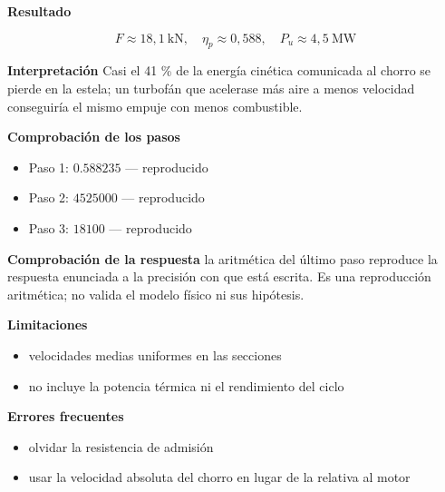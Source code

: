 \documentclass[10pt,openany]{book}
\begin{document}
\begin{tcolorbox}[title={Problema resuelto}, studiumworked, breakable]
\noindent\textbf{Resultado}

\[
F \approx 18{,}1\ \mathrm{kN},\quad \eta_p \approx 0{,}588,\quad P_u \approx 4{,}5\ \mathrm{MW}
\]

\noindent\textbf{Interpretación}
Casi el 41 \% de la energía cinética comunicada al chorro se pierde en la estela; un turbofán que acelerase más aire a menos velocidad conseguiría el mismo empuje con menos combustible.

\noindent\textbf{Comprobación de los pasos}
\begin{itemize}
\item Paso 1: $0.588235$ — reproducido
\item Paso 2: $4525000$ — reproducido
\item Paso 3: $18100$ — reproducido
\end{itemize}

\noindent\textbf{Comprobación de la respuesta} la aritmética del último paso reproduce la respuesta enunciada a la precisión con que está escrita. Es una reproducción aritmética; no valida el modelo físico ni sus hipótesis.

\noindent\textbf{Limitaciones}
\begin{itemize}
\item velocidades medias uniformes en las secciones
\item no incluye la potencia térmica ni el rendimiento del ciclo
\end{itemize}

\noindent\textbf{Errores frecuentes}
\begin{itemize}
\item olvidar la resistencia de admisión
\item usar la velocidad absoluta del chorro en lugar de la relativa al motor
\end{itemize}
\end{tcolorbox}
\end{document}
